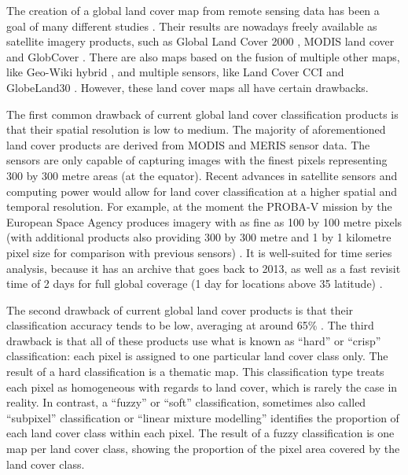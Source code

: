 \documentclass[a4paper,12pt]{scrbook}
\begin{document}
The creation of a global land cover map from remote sensing data has been a goal of many different studies \citep{hansen2000hardtree}. Their results are nowadays freely available as satellite imagery products, such as Global Land Cover 2000 \citep{bartholome2005glc2000}, MODIS land cover \citep{friedl2010modis} and GlobCover \citep{arino2007globcover}. There are also maps based on the fusion of multiple other maps, like Geo-Wiki hybrid \citep{see2015hybrid}, and multiple sensors, like Land Cover CCI \citep{lccciguide} and GlobeLand30 \citep{chen2015globeland30}. However, these land cover maps all have certain drawbacks.

The first common drawback of current global land cover classification products is that their spatial resolution is low to medium. The majority of aforementioned land cover products are derived from MODIS and MERIS sensor data. The sensors are only capable of capturing images with the finest pixels representing 300 by 300 metre areas (at the equator). Recent advances in satellite sensors and computing power would allow for land cover classification at a higher spatial and temporal resolution. For example, at the moment the PROBA-V mission by the European Space Agency produces imagery with as fine as 100 by 100 metre pixels (with additional products also providing 300 by 300 metre and 1 by 1 kilometre pixel size for comparison with previous sensors) \citep{probavguide}. It is well-suited for time series analysis, because it has an archive that goes back to 2013, as well as a fast revisit time of 2 days for full global coverage (1 day for locations above 35\textdegree{} latitude) \citep{dierckx2014probav}.

The second drawback of current global land cover products is that their classification accuracy tends to be low, averaging at around 65\% \citep{tsendbazar2016integrating}. The third drawback is that all of these products use what is known as ``hard'' or ``crisp'' classification: each pixel is assigned to one particular land cover class only. The result of a hard classification is a thematic map. This classification type treats each pixel as homogeneous with regards to land cover, which is rarely the case in reality. In contrast, a ``fuzzy'' or ``soft'' classification, sometimes also called ``subpixel'' classification or ``linear mixture modelling'' \citep{Okeke2006fuzzyexponent} identifies the proportion of each land cover class within each pixel. The result of a fuzzy classification is one map per land cover class, showing the proportion of the pixel area covered by the land cover class.
\end{document}
